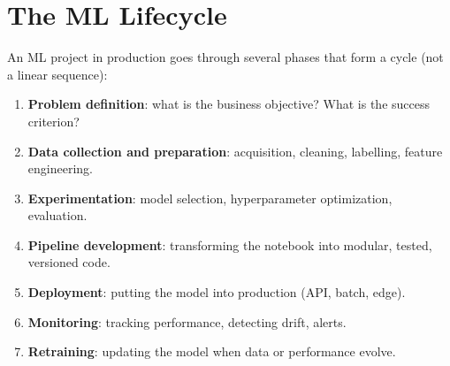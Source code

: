 \begin{center}
\end{center}

\section{The ML Lifecycle}
\label{sec:ml-lifecycle}

An ML project in production goes through several phases that form a cycle
(not a linear sequence):

\begin{enumerate}
  \item \textbf{Problem definition}: what is the business objective? What
    is the success criterion?
  \item \textbf{Data collection and preparation}: acquisition, cleaning,
    labelling, feature engineering.
  \item \textbf{Experimentation}: model selection, hyperparameter
    optimization, evaluation.
  \item \textbf{Pipeline development}: transforming the notebook into
    modular, tested, versioned code.
  \item \textbf{Deployment}: putting the model into production (API,
    batch, edge).
  \item \textbf{Monitoring}: tracking performance, detecting drift, alerts.
  \item \textbf{Retraining}: updating the model when data or performance
    evolve.
\end{enumerate}

